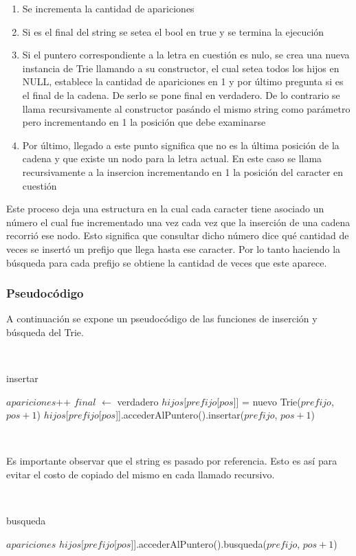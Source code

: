 \begin{enumerate}
\item Se incrementa la cantidad de apariciones
\item Si es el final del string se setea el bool en true y se termina la
ejecución
\item Si el puntero correspondiente a la letra en cuestión es nulo, se crea
una nueva instancia de Trie llamando a su constructor, el cual setea todos los
hijos en NULL, establece la cantidad de apariciones en 1 y por último pregunta
si es el final de la cadena. De serlo se pone final en verdadero. De lo
contrario se llama recursivamente al constructor pasándo el mismo string como
parámetro pero incrementando en 1 la posición que debe examinarse
\item Por último, llegado a este punto significa que no es la última posición
de la cadena y que existe un nodo para la letra actual. En este caso se llama
recursivamente a la insercion incrementando en 1 la posición del caracter en
cuestión
\end{enumerate}

Este proceso deja una estructura en la cual cada caracter tiene asociado un
número el cual fue incrementado una vez cada vez que la inserción de una
cadena recorrió ese nodo. Esto significa que consultar dicho número dice
qué cantidad de veces se insertó un prefijo que llega hasta ese caracter.
Por lo tanto haciendo la búsqueda para cada prefijo se obtiene la cantidad de
veces que este aparece.

\subsubsection{Pseudocódigo}

A continuación se expone un pseudocódigo de las funciones de inserción y
búsqueda del Trie.

~

\begin{algorithm}[H]
	\caption{insertar}

	$apariciones$++ \;
	 {
		$final$ $\gets$ verdadero \;
	} {
		 {
			$hijos$[$prefijo$[$pos$]] = nuevo Trie($prefijo$, $pos + 1$) \;
		} {
			$hijos$[$prefijo$[$pos$]].accederAlPuntero().insertar($prefijo$, $pos + 1$) \;
		}
	}
\end{algorithm}

~

Es importante observar que el string es pasado por referencia. Esto es así
para evitar el costo de copiado del mismo en cada llamado recursivo.

~

\begin{algorithm}[H]
	\caption{busqueda}

	 {
		\Return $apariciones$ \;
	} {
		 {
			 \;
		} {
			\Return $hijos$[$prefijo$[$pos$]].accederAlPuntero().busqueda($prefijo$, $pos + 1$) \;
		}
	}
\end{algorithm}